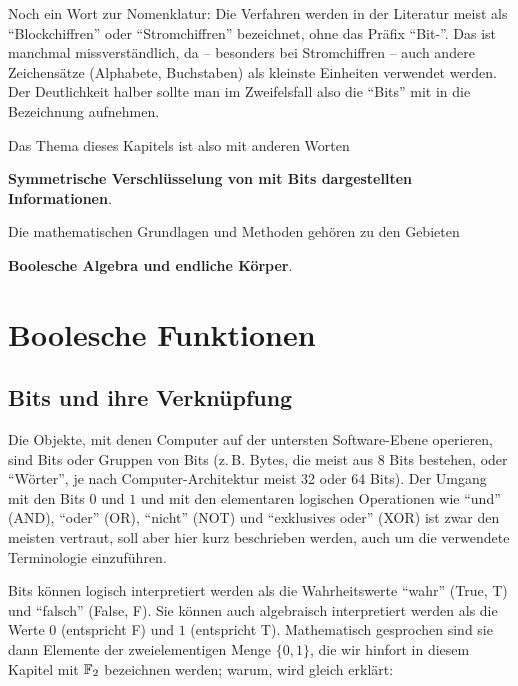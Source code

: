 \begin{refsegment}
Noch ein Wort zur Nomenklatur: Die Verfahren werden in der Literatur
meist als "`Blockchiffren"' oder
"`Stromchiffren"' bezeichnet, ohne
das Präfix "`Bit-"'. Das ist manchmal missverständlich, da -- besonders
bei Stromchiffren -- auch andere Zeichensätze (Alphabete, Buchstaben)
als kleinste Einheiten verwendet werden. Der Deutlichkeit halber
sollte man im Zweifelsfall also die "`Bits"' mit in die Bezeichnung
aufnehmen.

Das Thema dieses Kapitels ist also mit anderen Worten

   {\bf Symmetrische Verschlüsselung von mit Bits dargestellten Informationen}.

\noindent Die mathematischen Grundlagen und Methoden gehören zu den Gebieten

   {\bf Boolesche Algebra
   und endliche Körper}.


\newpage
\section{Boolesche Funktionen}\label{s-bool-fct}
\subsection{Bits und ihre Verknüpfung}\label{s-bool-bit}

Die Objekte, mit denen Computer auf der untersten Software-Ebene operieren,
sind Bits oder Gruppen von Bits (z.\,B. Bytes,
die meist aus 8 Bits bestehen,
oder "`Wörter"', je nach Computer-Architektur meist 32 oder 64 Bits).
Der Umgang mit den Bits $0$ und $1$ und mit den elementaren
logischen Operationen wie "`und"' (AND), "`oder"' (OR),
"`nicht"' (NOT) und "`exklusives oder"' (XOR) ist zwar den meisten
vertraut, soll aber hier kurz beschrieben werden, auch um die verwendete
Terminologie einzuführen.

Bits können logisch interpretiert werden als die
Wahrheitswerte "`wahr"'
(True, T) und "`falsch"' (False, F). Sie können auch algebraisch interpretiert
werden als die Werte $0$ (entspricht F) und $1$ (entspricht T). Mathematisch
gesprochen sind sie dann Elemente der zweielementigen Menge $\{0, 1\}$,
die wir hinfort in diesem Kapitel mit $\mathbb{F}_2$ bezeichnen werden; warum,
wird gleich erklärt:


\end{refsegment}
